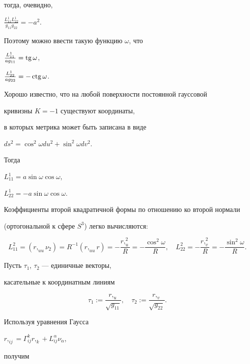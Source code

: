 тогда, очевидно,


$\frac{L_{11}^1 L_{22}^1}{g_{11} g_{22}} = - a^2$.


Поэтому можно ввести такую функцию $\omega$, что 


$\frac{L_{11}^1}{a g_{11}} = \operatorname{tg}\omega$,


$\frac{L_{22}^1}{a g_{22}} = - \operatorname{ctg} \omega$.


Хорошо известно, что на любой поверхности постоянной гауссовой


кривизны $K=-1$ существуют координаты,


в которых метрика может быть записана в виде


$ds^2 = \cos^2\omega du^2 + \sin^2 \omega dv^2$.


Тогда


$L_{11}^1 = a\sin\omega\cos\omega$,


$L_{22}^1 = - a\sin\omega\cos\omega$.


Коэффициенты второй квадратичной формы по отношению ко второй нормали


(ортогональной к сфере $S^3$) легко вычисляются:


$$


L_{11}^2 = (r,_{uu} \nu_2) = R^{-1} (r,_{uu} r) = - \frac{r,_u^2}{R} =


- \frac{\cos^2\omega}{R},\quad


L_{22}^2 = - \frac{r,_v^2}{R} = - \frac{\sin^2\omega}{R}.


$$


Пусть $\tau_1$, $\tau_2$ --- единичные векторы,


касательные к координатным линиям


$$


\tau_1 := \frac{r,_u}{\sqrt{g_{11}}}, \quad 


\tau_2 := \frac{r,_v}{\sqrt{g_{22}}}.


$$


Используя уравнения Гаусса


$r,_{ij} = \Gamma_{ij}^k r,_k + L_{ij}^\alpha \nu_\alpha$,


получим





